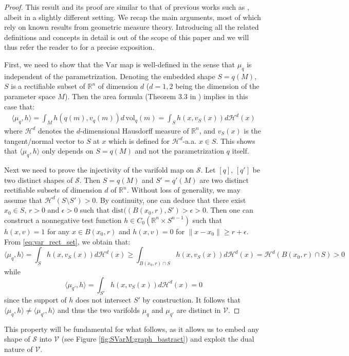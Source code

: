 \documentclass[11pt]{article}
\newcommand{\R}{\mathbb{R}}
\begin{document}
\begin{proof}
This result and its proof are similar to that of previous works such as \cite{charon2013varifold,bauer2019relaxed}, albeit in a slightly different setting. We recap the main arguments, most of which rely on known results from geometric measure theory. Introducing all the related definitions and concepts in detail is out of the scope of this paper and we will thus refer the reader to \cite{simon2014introduction} for a precise exposition. 

First, we need to show that the $\text{Var}$ map is well-defined in the sense that $\mu_q$ is independent of the parametrization. Denoting the embedded shape $S=q(M)$, $S$ is a rectifiable subset of $\R^n$ of dimension $d$ ($d=1,2$ being the dimension of the parameter space $M$). Then the area formula (Theorem 3.3 in \cite{simon2014introduction}) implies in this case that:
\begin{align}
\label{eq:var_rect_set}
    \langle \mu_{q}, h\rangle = \int_M h(q(m), v_{q}(m)) d \, \text{vol}_{q}(m) = \int_{S} h(x,v_S(x)) d\mathcal{H}^{d}(x) 
\end{align}
where $\mathcal{H}^d$ denotes the $d$-dimensional Hausdorff measure of $\R^n$, and $v_S(x)$ is the tangent/normal vector to $S$ at $x$ which is defined for $\mathcal{H}^{d}$-a.a. $x \in S$. This shows that $\langle \mu_q,h\rangle$ only depends on $S=q(M)$ and not the parametrization $q$ itself.

Next we need to prove the injectivity of the varifold map on $\mathcal{S}$. Let $[q]$, $[q']$ be two distinct shapes of $\mathcal{S}$. Then $S=q(M)$ and $S'=q'(M)$ are two distinct rectifiable subsets of dimension $d$ of $\R^n$. Without loss of generality, we may assume that $\mathcal{H}^d(S\setminus S') >0$. By continuity, one can deduce that there exist $x_0 \in S$, $r>0$ and $\epsilon>0$ such that $\text{dist}((B(x_0,r),S')> \epsilon >0$. Then one can construct a nonnegative test function $h \in C_0(\R^n \times S^{n-1})$ such that $h(x,v)=1$ for any $x \in B(x_0,r)$ and $h(x,v)=0$ for $\|x-x_0\|\geq r+\epsilon$. From \eqref{eq:var_rect_set}, we obtain that:
\begin{equation*}
  \langle \mu_{q}, h\rangle = \int_{S} h(x,v_S(x)) d\mathcal{H}^{d}(x) \geq \int_{B(x_0,r)\cap S} h(x,v_S(x)) d\mathcal{H}^{d}(x) = \mathcal{H}^d(B(x_0,r)\cap S)>0
\end{equation*}
while
\begin{equation*}
  \langle \mu_{q'}, h\rangle = \int_{S'} h(x,v_S(x)) d\mathcal{H}^{d}(x)=0
\end{equation*}
since the support of $h$ does not intersect $S'$ by construction. It follows that $\langle \mu_q,h \rangle \neq \langle \mu_{q'},h \rangle$ and thus the two varifolds $\mu_q$ and $\mu_{q'}$ are distinct in $\mathcal{V}$.
\end{proof}
This property will be fundamental for what follows, as it allows us to embed any shape of $\mathcal{S}$ into $\mathcal{V}$ (see Figure \ref{fig:SVarM:graph_bastract}) and exploit the dual nature of $\mathcal{V}$.
\end{document}
